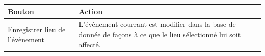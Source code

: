 \documentclass[a4paper,11pt]{article}
\begin{document}
\begin{table}[H]
  \begin{center}
    \begin{tabular}{|m{4cm}|m{10cm}|}
       \hline
       \textbf{Bouton} & \textbf{Action} \\
       \hline
       Enregistrer lieu de l'évènement & L'évènement courrant est modifier dans la base de donnée de façons à ce que le lieu sélectionné lui soit affecté.   \\
       \hline
    \end{tabular}
  \end{center}
\end{table}
\end{document}
